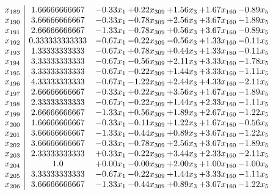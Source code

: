 \documentclass[8pt]{article}
\begin{document}
\[\begin{array}{c| c c@{\hskip 2pt} c@{\hskip 2pt} c@{\hskip 2pt} c@{\hskip 2pt} c@{\hskip 2pt} }
 x_{189}   &  1.66666666667 & -0.33 x_{1} & +  0.22 x_{309} & +  1.56 x_{3} & +  1.67 x_{160} & -0.89 x_{5}\\
 x_{190}   &  3.66666666667 & -0.33 x_{1} & -0.78 x_{309} & +  2.56 x_{3} & +  3.67 x_{160} & -1.89 x_{5}\\
 x_{191}   &  2.66666666667 & -1.33 x_{1} & -0.78 x_{309} & +  0.56 x_{3} & +  3.67 x_{160} & -0.89 x_{5}\\
 x_{192}   &  0.333333333333 & -0.67 x_{1} & -0.22 x_{309} & -0.56 x_{3} & +  1.33 x_{160} & -0.11 x_{5}\\
 x_{193}   &  1.33333333333 & -0.67 x_{1} & +  0.78 x_{309} & +  0.44 x_{3} & +  1.33 x_{160} & -0.11 x_{5}\\
 x_{194}   &  3.33333333333 & -0.67 x_{1} & -0.56 x_{309} & +  2.11 x_{3} & +  3.33 x_{160} & -1.78 x_{5}\\
 x_{195}   &  3.33333333333 & -0.67 x_{1} & -0.22 x_{309} & +  1.44 x_{3} & +  3.33 x_{160} & -1.11 x_{5}\\
 x_{196}   &  4.33333333333 & -0.67 x_{1} & -1.22 x_{309} & +  2.44 x_{3} & +  4.33 x_{160} & -2.11 x_{5}\\
 x_{197}   &  2.66666666667 & -0.33 x_{1} & +  0.22 x_{309} & +  3.56 x_{3} & +  1.67 x_{160} & -1.89 x_{5}\\
 x_{198}   &  2.33333333333 & -0.67 x_{1} & -0.22 x_{309} & +  1.44 x_{3} & +  2.33 x_{160} & -1.11 x_{5}\\
 x_{199}   &  2.66666666667 & -1.33 x_{1} & +  0.56 x_{309} & +  1.89 x_{3} & +  2.67 x_{160} & -1.22 x_{5}\\
 x_{200}   &  1.66666666667 & -0.33 x_{1} & -0.11 x_{309} & +  1.22 x_{3} & +  1.67 x_{160} & -0.56 x_{5}\\
 x_{201}   &  3.66666666667 & -1.33 x_{1} & -0.44 x_{309} & +  0.89 x_{3} & +  3.67 x_{160} & -1.22 x_{5}\\
 x_{202}   &  3.66666666667 & -0.33 x_{1} & -0.78 x_{309} & +  2.56 x_{3} & +  3.67 x_{160} & -1.89 x_{5}\\
 x_{203}   &  2.33333333333 & +  0.33 x_{1} & -0.22 x_{309} & +  3.44 x_{3} & +  2.33 x_{160} & -2.11 x_{5}\\
 x_{204}   &  1.0 & +  0.00 x_{1} & -0.00 x_{309} & +  2.00 x_{3} & +  1.00 x_{160} & -1.00 x_{5}\\
 x_{205}   &  3.33333333333 & -0.67 x_{1} & -0.22 x_{309} & +  1.44 x_{3} & +  3.33 x_{160} & -1.11 x_{5}\\
 x_{206}   &  3.66666666667 & -1.33 x_{1} & -0.44 x_{309} & +  0.89 x_{3} & +  3.67 x_{160} & -1.22 x_{5}\\

\end{array}\]
\end{document}
